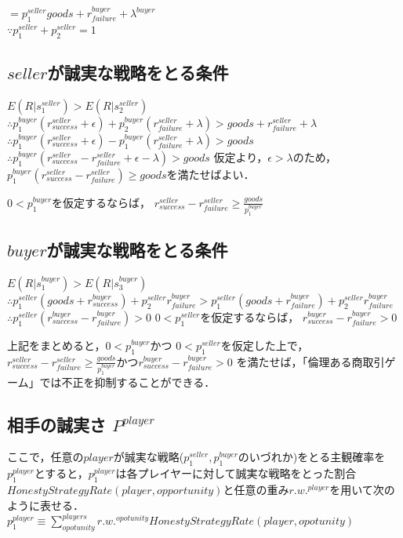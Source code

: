 \documentclass[twocolumn, a4j]{article}
\begin{document}
$ = p^{seller}_1 goods + r^{buyer}_{failure} + \lambda^{buyer} $ \\

$ \because p^{seller}_1 + p^{seller}_2 = 1 $ \\


\subsection{$ seller $が誠実な戦略をとる条件}

$ E(R|s^{seller}_1) > E(R|s^{seller}_2) $
$ \therefore p^{buyer}_1 (r^{seller}_{success} + \epsilon) + p^{buyer}_2 (r^{seller}_{failure} + \lambda) > goods + r^{seller}_{failure} + \lambda $
$ \therefore p^{buyer}_1(r^{seller}_{success} + \epsilon) - p^{buyer}_1(r^{seller}_{failure} + \lambda) > goods $
$ \therefore p^{buyer}_1(r^{seller}_{success} - r^{seller}_{failure} + \epsilon - \lambda) > goods $
仮定より，$ \epsilon > \lambda $のため，
$ p^{buyer}_1 (r^{seller}_{success} - r^{seller}_{failure}) \geq goods $を満たせばよい．

$ 0 < p^{buyer}_1 $を仮定するならば，
$ r^{seller}_{success} - r^{seller}_{failure} \geq \frac{goods}{p^{buyer}_1} $


\subsection{$ buyer $が誠実な戦略をとる条件}

$ E(R|s^{buyer}_1) > E(R|s^{buyer}_3) $
$ \therefore p^{seller}_1 (goods + r^{buyer}_{success}) + p^{seller}_2 r^{buyer}_{failure} > p^{seller}_1(goods+r^{buyer}_{failure}) + p^{seller}_2 r^{buyer}_{failure} $
$ \therefore p^{seller}_1(r^{buyer}_{success} - r^{buyer}_{failure}) > 0 $
$ 0 < p^{seller}_1 $を仮定するならば，
$ r^{buyer}_{success} - r^{buyer}_{failure} > 0 $

上記をまとめると，$ 0<p^{buyer}_1 $かつ $ 0 < p^{seller}_{1} $を仮定した上で，
$ r^{seller}_{success} - r^{seller}_{failure} \geq \frac{goods}{p^{buyer}_1} $かつ$ r^{buyer}_{success} - r^{buyer}_{failure} > 0 $
を満たせば，「倫理ある商取引ゲーム」では不正を抑制することができる．


\subsection{相手の誠実さ $ P^{player} $}

ここで，任意の$ player $が誠実な戦略($ p^{seller}_1, p^{buyer}_1 $のいづれか)をとる主観確率を$ p^{player}_1 $とすると，$ p^{player}_1 $は各プレイヤーに対して誠実な戦略をとった割合$ HonestyStrategyRate(player, opportunity) $と任意の重み$ r.w.^{player} $を用いて次のように表せる．
$ p^{player}_1 \equiv \sum^{players}_{opotunity} r.w.^{opotunity} HonestyStrategyRate(player, opotunity) $
\end{document}
